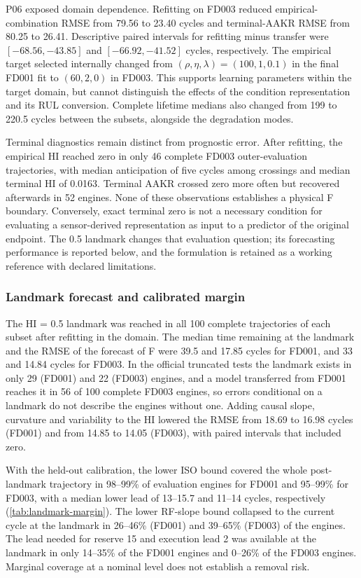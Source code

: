 \documentclass[preprint,12pt]{elsarticle}
\begin{document}
P06 exposed domain dependence. Refitting on FD003 reduced empirical-combination RMSE from 79.56 to 23.40 cycles and terminal-AAKR RMSE from 80.25 to 26.41. Descriptive paired intervals for refitting minus transfer were $[-68.56,-43.85]$ and $[-66.92,-41.52]$ cycles, respectively. The empirical target selected internally changed from $(\rho,\eta,\lambda)=(100,1,0.1)$ in the final FD001 fit to $(60,2,0)$ in FD003. This supports learning parameters within the target domain, but cannot distinguish the effects of the condition representation and its RUL conversion. Complete lifetime medians also changed from 199 to 220.5 cycles between the subsets, alongside the degradation modes.

Terminal diagnostics remain distinct from prognostic error. After refitting, the empirical HI reached zero in only 46 complete FD003 outer-evaluation trajectories, with median anticipation of five cycles among crossings and median terminal HI of 0.0163. Terminal AAKR crossed zero more often but recovered afterwards in 52 engines. None of these observations establishes a physical F boundary. Conversely, exact terminal zero is not a necessary condition for evaluating a sensor-derived representation as input to a predictor of the original endpoint. The 0.5 landmark changes that evaluation question; its forecasting performance is reported below, and the formulation is retained as a working reference with declared limitations.

\subsubsection{Landmark forecast and calibrated margin}

The HI = 0.5 landmark was reached in all 100 complete trajectories of each subset after refitting in the domain. The median time remaining at the landmark and the RMSE of the forecast of F were 39.5 and 17.85 cycles for FD001, and 33 and 14.84 cycles for FD003. In the official truncated tests the landmark exists in only 29 (FD001) and 22 (FD003) engines, and a model transferred from FD001 reaches it in 56 of 100 complete FD003 engines, so errors conditional on a landmark do not describe the engines without one. Adding causal slope, curvature and variability to the HI lowered the RMSE from 18.69 to 16.98 cycles (FD001) and from 14.85 to 14.05 (FD003), with paired intervals that included zero.

With the held-out calibration, the lower ISO bound covered the whole post-landmark trajectory in 98--99\% of evaluation engines for FD001 and 95--99\% for FD003, with a median lower lead of 13--15.7 and 11--14 cycles, respectively (\cref{tab:landmark-margin}). The lower RF-slope bound collapsed to the current cycle at the landmark in 26--46\% (FD001) and 39--65\% (FD003) of the engines. The lead needed for reserve 15 and execution lead 2 was available at the landmark in only 14--35\% of the FD001 engines and 0--26\% of the FD003 engines. Marginal coverage at a nominal level does not establish a removal risk.
\end{document}
